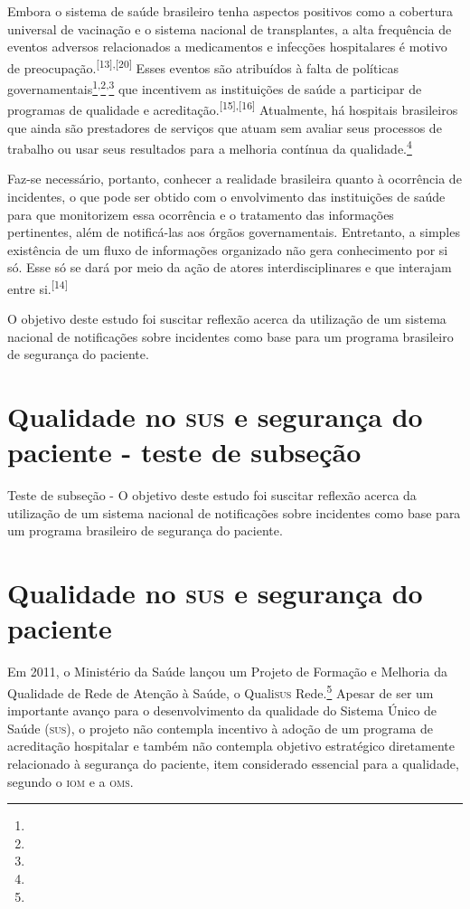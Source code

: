 \documentclass{article}
\begin{document}
Embora o sistema de saúde brasileiro tenha aspectos positivos como a cobertura
universal de
vacinação e o sistema nacional de transplantes, a alta frequência de eventos
adversos
relacionados a medicamentos e infecções hospitalares é motivo de preocupação.\textsuperscript{[}\textsuperscript{13}\textsuperscript{]}\textsuperscript{,}\textsuperscript{[}\textsuperscript{20}\textsuperscript{]}
Esses eventos são atribuídos à falta de políticas governamentais\footnote{}\textsuperscript{,}\footnote{}\textsuperscript{,}\footnote{}
que incentivem as instituições de saúde a participar de programas de qualidade e
acreditação.\textsuperscript{[}\textsuperscript{15}\textsuperscript{]}\textsuperscript{,}\textsuperscript{[}\textsuperscript{16}\textsuperscript{]}
Atualmente, há hospitais brasileiros que ainda são prestadores de serviços que
atuam
sem avaliar seus processos de trabalho ou usar seus resultados para a melhoria
contínua da
qualidade.\footnote{}

Faz-se necessário, portanto, conhecer a realidade brasileira quanto à ocorrência
de
incidentes, o que pode ser obtido com o envolvimento das instituições de saúde
para que
monitorizem essa ocorrência e o tratamento das informações pertinentes, além de
notificá-las
aos órgãos governamentais. Entretanto, a simples existência de um fluxo de
informações
organizado não gera conhecimento por si só. Esse só se dará por meio da ação de
atores
interdisciplinares e que interajam entre si.\textsuperscript{[}\textsuperscript{14}\textsuperscript{]}

O objetivo deste estudo foi suscitar reflexão acerca da utilização de um sistema
nacional
de notificações sobre incidentes como base para um programa brasileiro de
segurança do
paciente.
\section{Qualidade no \textsc{sus} e segurança do paciente - teste de subseção}

Teste de subseção - O objetivo deste estudo foi suscitar reflexão acerca da
utilização de um sistema nacional
de notificações sobre incidentes como base para um programa brasileiro de
segurança do
paciente.

\section{Qualidade no \textsc{sus} e segurança do paciente}

Em 2011, o Ministério da Saúde lançou um Projeto de Formação e Melhoria da
Qualidade de
Rede de Atenção à Saúde, o Quali\textsc{sus} Rede.\footnote{}
Apesar de ser um importante avanço para o desenvolvimento da qualidade do
Sistema
Único de Saúde (\textsc{sus}), o projeto não contempla incentivo à adoção de um programa
de
acreditação hospitalar e também não contempla objetivo estratégico diretamente
relacionado à
segurança do paciente, item considerado essencial para a qualidade, segundo o
\textsc{iom} e a
\textsc{oms}.
\end{document}
